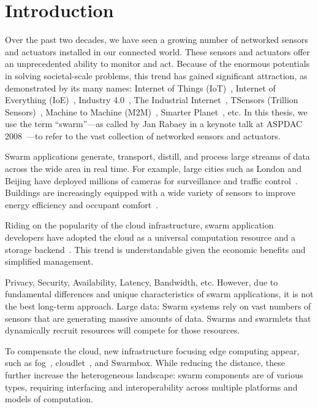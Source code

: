 \documentclass[thesis.tex]{subfiles}
\begin{document}
\chapter{Introduction}

Over the past two decades, we have seen a growing number of networked sensors
and actuators installed in our connected world. These sensors and actuators
offer an unprecedented ability to monitor and act. Because of the enormous
potentials in solving societal-scale problems, this trend has gained significant
attraction, as demonstrated by its many names: Internet of Things
(IoT)~\cite{atzori2010internet}, Internet of Everything
(IoE)~\cite{bradley2013internet}, Industry 4.0~\cite{lasi2014industry}, The
Industrial Internet~\cite{eigner2018industrial}, TSensors (Trillion
Sensors)~\cite{bogue2014towards}, Machine to Machine
(M2M)~\cite{anton2014machine}, Smarter Planet~\cite{palmisano2008smarter},
etc. In this thesis, we use the term ``swarm''---as called by Jan Rabaey in a
keynote talk at ASPDAC 2008~\cite{rabaey2008brand}---to refer to the vast
collection of networked sensors and actuators.

Swarm applications generate, transport, distill, and process large streams of
data across the wide area in real time. For example, large cities such as London
and Beijing have deployed millions of cameras for surveillance and traffic
control~\cite{skynet, london.surveillance}. Buildings are increasingly equipped
with a wide variety of sensors to improve energy efficiency and occupant
comfort~\cite{dawson2010smap, krioukov2012building}.

Riding on the popularity of the cloud infrastructure, swarm application
developers have adopted the cloud as a universal computation resource and a
storage backend~\cite{carriots, grovestreams, sami, xively, gupta2014bolt,
  zachariah1001internet}. This trend is understandable given the economic
benefits and simplified management.

Privacy, Security, Availability, Latency, Bandwidth, etc. However, due to
fundamental differences and unique characteristics of swarm applications, it is
not the best long-term approach. Large data: Swarm systems rely on vast numbers
of sensors that are generating massive amounts of data. Swarms and swarmlets
that dynamically recruit resources will compete for those resources.

To compensate the cloud, new infrastructure focusing edge computing appear, such
as fog~\cite{bonomi2012fog, bar2013fog}, cloudlet~\cite{ha2014towards,
  satyanarayanan2009case, chen2018application}, and Swarmbox. While reducing the
distance, these further increase the heterogeneous landscape: swarm components
are of various types, requiring interfacing and interoperability across multiple
platforms and models of computation.
\end{document}
